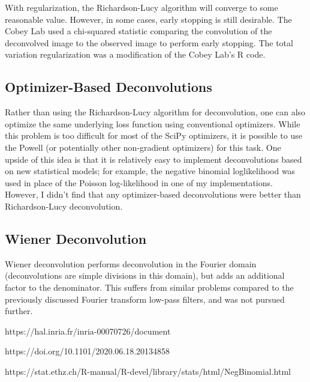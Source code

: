 \documentclass{article}
\begin{document}
With regularization, the Richardson-Lucy algorithm will converge to some reasonable value. However, in some cases, early stopping is still desirable. The Cobey Lab used a chi-squared statistic comparing the convolution of the deconvolved image to the observed image to perform early stopping. The total variation regularization was a modification of the Cobey Lab's R code.

\subsection{Optimizer-Based Deconvolutions}
Rather than using the Richardson-Lucy algorithm for deconvolution, one can also optimize the same underlying loss function using conventional optimizers. While this problem is too difficult for most of the SciPy optimizers, it is possible to use the Powell (or potentially other non-gradient optimizers) for this task. One upside of this idea is that it is relatively easy to implement deconvolutions based on new statistical models; for example, the negative binomial loglikelihood was used in place of the Poisson log-likelihood in one of my implementations. However, I didn't find that any optimizer-based deconvolutions were better than Richardson-Lucy deconvolution.

\subsection{Wiener Deconvolution}
Wiener deconvolution performs deconvolution in the Fourier domain (deconvolutions are simple divisions in this domain), but adds an additional factor to the denominator. This suffers from similar problems compared to the previously discussed Fourier transform low-pass filters, and was not pursued further.




\begin{thebibliography}{1}
https://hal.inria.fr/inria-00070726/document
    
https://doi.org/10.1101/2020.06.18.20134858

https://stat.ethz.ch/R-manual/R-devel/library/stats/html/NegBinomial.html

\end{thebibliography}
\end{document}
